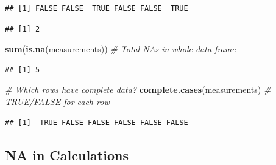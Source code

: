 \documentclass[
]{article}
\newenvironment{Shaded}{\begin{snugshade}}{\end{snugshade}}
\newcommand{\CommentTok}[1]{\textcolor[rgb]{0.56,0.35,0.01}{\textit{#1}}}
\newcommand{\FunctionTok}[1]{\textcolor[rgb]{0.13,0.29,0.53}{\textbf{#1}}}
\newcommand{\NormalTok}[1]{#1}
\newcommand{\SpecialCharTok}[1]{\textcolor[rgb]{0.81,0.36,0.00}{\textbf{#1}}}
\begin{document}
\begin{Shaded}
\end{Shaded}

\begin{verbatim}
## [1] FALSE FALSE  TRUE FALSE FALSE  TRUE
\end{verbatim}

\begin{Shaded}
\end{Shaded}

\begin{verbatim}
## [1] 2
\end{verbatim}

\begin{Shaded}
\begin{Highlighting}[]
\FunctionTok{sum}\NormalTok{(}\FunctionTok{is.na}\NormalTok{(measurements))             }\CommentTok{\# Total NAs in whole data frame}
\end{Highlighting}
\end{Shaded}

\begin{verbatim}
## [1] 5
\end{verbatim}

\begin{Shaded}
\begin{Highlighting}[]
\CommentTok{\# Which rows have complete data?}
\FunctionTok{complete.cases}\NormalTok{(measurements)          }\CommentTok{\# TRUE/FALSE for each row}
\end{Highlighting}
\end{Shaded}

\begin{verbatim}
## [1]  TRUE FALSE FALSE FALSE FALSE FALSE
\end{verbatim}

\subsection{NA in Calculations}\label{na-in-calculations}
\end{document}

